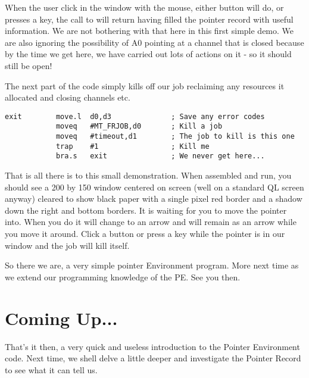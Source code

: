 When the user click in the window with the mouse, either button will do, or presses
a key, the call to  will return having filled the pointer record with useful
information. We are not bothering with that here in this first simple demo. We are also
ignoring the possibility of A0 pointing at a channel that is closed because by the time we
get here, we have carried out lots of actions on it -{} so it should still be open!

The next part of the code simply kills off our job reclaiming any resources it
allocated and closing channels etc.

\begin{lstlisting}[firstnumber=last,caption={Simple PE Program - Part 10}]
exit        move.l  d0,d3              ; Save any error codes
            moveq   #MT_FRJOB,d0       ; Kill a job
            moveq   #timeout,d1        ; The job to kill is this one
            trap    #1                 ; Kill me
            bra.s   exit               ; We never get here...
\end{lstlisting}

That is all there is to this small demonstration. When assembled and run, you should
see a 200 by 150 window centered on screen (well on a standard QL screen anyway) cleared
to show black paper with a single pixel red border and a shadow down the right and bottom
borders. It is waiting for you to move the pointer into. When you do it will change to an
arrow and will remain as an arrow while you move it around. Click a button or press a key
while the pointer is in our window and the job will kill itself.

So there we are, a very simple pointer Environment program. More next time as we
extend our programming knowledge of the PE. See you then.

\section{Coming Up...}
\label{ch20-the-end}%

That's it then, a very quick and useless introduction to the Pointer Environment
code. Next time, we shell delve a little deeper and investigate the Pointer Record to see
what it can tell us.

